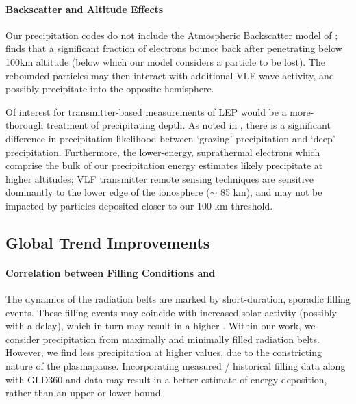\paragraph{Backscatter and Altitude Effects}
Our precipitation codes do not include the Atmospheric Backscatter model of \cite{Cotts2011}; \citeauthor{Cotts2011} finds that a significant fraction of electrons bounce back after penetrating below 100km altitude (below which our model considers a particle to be lost). The rebounded particles may then interact with additional VLF wave activity, and possibly precipitate into the opposite hemisphere.

Of interest for transmitter-based measurements of LEP would be a more-thorough treatment of precipitating depth. As noted in \cite{Cotts2011}, there is a significant difference in precipitation likelihood between `grazing' precipitation and `deep' precipitation. Furthermore, the lower-energy, suprathermal electrons which comprise the bulk of our precipitation energy estimates likely precipitate at higher altitudes; VLF transmitter remote sensing techniques are sensitive dominantly to the lower edge of the ionosphere ($\sim$ 85 km), and may not be impacted by particles deposited closer to our 100 km threshold.

\subsection{Global Trend Improvements}
\paragraph{Correlation between Filling Conditions and \kp{}}
The dynamics of the radiation belts are marked by short-duration, sporadic filling events. These filling events may coincide with increased solar activity (possibly with a delay), which in turn may result in a higher \kp{}. Within our work, we consider precipitation from maximally and minimally filled radiation belts. However, we find less precipitation at higher \kp{} values, due to the constricting nature of the plasmapause. Incorporating measured / historical filling data along with GLD360 and \kp{} data may result in a better estimate of energy deposition, rather than an upper or lower bound.

